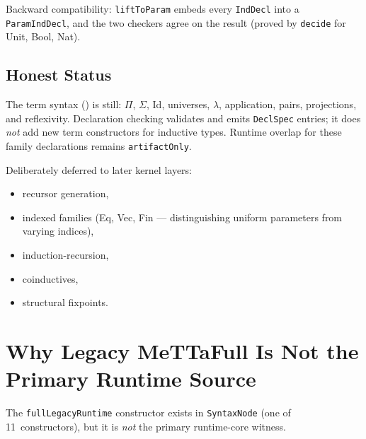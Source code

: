 \documentclass[11pt]{article}
\theoremstyle{remark}
\newcommand{\code}[1]{\texttt{#1}}
\newcommand{\codepath}[1]{\path{#1}}
\newcommand{\leanref}[1]{\texttt{#1}}
\begin{document}
\noindent
Backward compatibility: \leanref{liftToParam} embeds every \leanref{IndDecl}
into a \leanref{ParamIndDecl}, and the two checkers agree on the result
(proved by \code{decide} for Unit, Bool, Nat).

\subsection{Honest Status}

The term syntax (\codepath{Syntax.lean}) is still:
$\Pi$, $\Sigma$, Id, universes, $\lambda$, application, pairs, projections,
and reflexivity.
Declaration checking validates and emits \leanref{DeclSpec} entries; it does
\emph{not} add new term constructors for inductive types.
Runtime overlap for these family declarations remains \code{artifactOnly}.

\noindent
Deliberately deferred to later kernel layers:
\begin{itemize}[nosep]
  \item recursor generation,
  \item indexed families (Eq, Vec, Fin --- distinguishing uniform parameters
  from varying indices),
  \item induction-recursion,
  \item coinductives,
  \item structural fixpoints.
\end{itemize}

\section{Why Legacy MeTTaFull Is Not the Primary Runtime Source}
\label{sec:legacy}

The \code{fullLegacyRuntime} constructor exists in \leanref{SyntaxNode}
(one of 11~constructors), but it is \emph{not} the primary runtime-core
witness.
\end{document}
